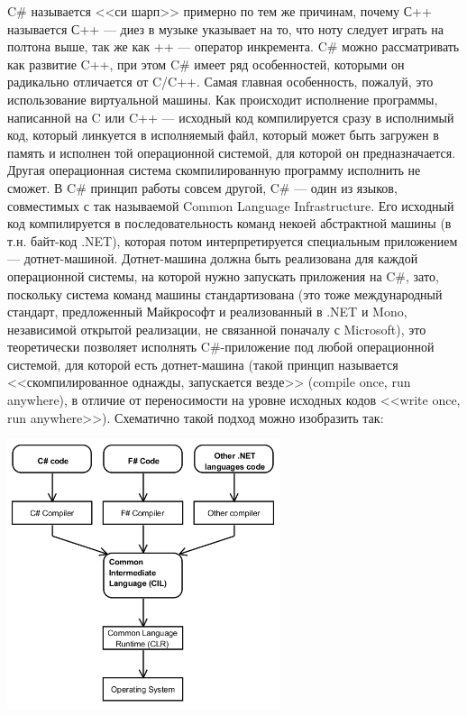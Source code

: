 \documentclass[a5paper]{article}
\begin{document}
C\# называется <<си шарп>> примерно по тем же причинам, почему С++ называется С++ --- диез в музыке указывает на то, что ноту следует играть на полтона выше, так же как ++ --- оператор инкремента. C\# можно рассматривать как развитие C++, при этом C\# имеет ряд особенностей, которыми он радикально отличается от C/C++. Самая главная особенность, пожалуй, это использование виртуальной машины. Как происходит исполнение программы, написанной на C или C++ --- исходный код компилируется сразу в исполнимый код, который линкуется в исполняемый файл, который может быть загружен в память и исполнен той операционной системой, для которой он предназначается. Другая операционная система скомпилированную программу исполнить не сможет. В C\# принцип работы совсем другой, C\# --- один из языков, совместимых с так называемой Common Language Infrastructure. Его исходный код компилируется в последовательность команд некоей абстрактной машины (в т.н. байт-код .NET), которая потом интерпретируется специальным приложением --- дотнет-машиной. Дотнет-машина должна быть реализована для каждой операционной системы, на которой нужно запускать приложения на C\#, зато, поскольку система команд машины стандартизована (это тоже международный стандарт, предложенный Майкрософт и реализованный в .NET и Mono, независимой открытой реализации, не связанной поначалу с Microsoft), это теоретически позволяет исполнять C\#-приложение под любой операционной системой, для которой есть дотнет-машина (такой принцип называется <<скомпилированное однажды, запускается везде>> (compile once, run anywhere), в отличие от переносимости на уровне исходных кодов <<write once, run anywhere>>). Схематично такой подход можно изобразить так:

\begin{center}
    \includegraphics[width=0.6\textwidth]{cli.png}
\end{center}
\end{document}
